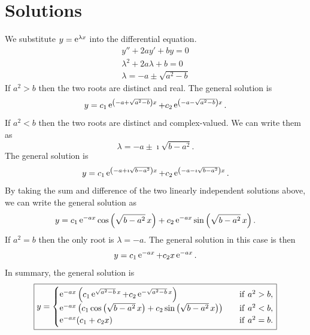 {
}
\raggedbottom
\pagebreak
\flushbottom
\section{Solutions}





\begin{Solution}
  \label{solution y+2ay+by}
  We substitute $y = \mathop{\mathrm{e}}\nolimits^{\lambda x}$ into the differential equation.
  \begin{gather*}
    y'' + 2 a y' + b y = 0 \\
    \lambda^2 + 2 a \lambda + b = 0 \\
    \lambda = -a \pm \sqrt{a^2 - b}
  \end{gather*}
  If $a^2 > b$ then the two roots are distinct and real.  The general solution
  is
  \[
  y = c_1 \mathop{\mathrm{e}}\nolimits^{\left(-a + \sqrt{a^2 - b} \right) x} 
  + c_2 \mathop{\mathrm{e}}\nolimits^{\left(-a - \sqrt{a^2 - b} \right) x}.
  \]
  If $a^2 < b$ then the two roots are distinct and complex-valued.  We 
  can write them as
  \[
  \lambda = -a \pm \imath \sqrt{b - a^2}.
  \]
  The general solution is
  \[
  y = c_1 \mathop{\mathrm{e}}\nolimits^{\left(-a + \imath \sqrt{b - a^2} \right) x} 
  + c_2 \mathop{\mathrm{e}}\nolimits^{\left(-a - \imath \sqrt{b - a^2} \right) x}.
  \]
  By taking the sum and difference of the two linearly independent solutions
  above, we can write the general solution as
  \[
  y = c_1 \mathop{\mathrm{e}}\nolimits^{-a x} \cos\left( \sqrt{b - a^2}\, x \right)
  + c_2 \mathop{\mathrm{e}}\nolimits^{-a x} \sin\left( \sqrt{b - a^2}\, x \right).
  \]
  If $a^2 = b$ then the only root is $\lambda = -a$.  The general solution in
  this case is then
  \[
  y = c_1 \mathop{\mathrm{e}}\nolimits^{-a x} + c_2 x \mathop{\mathrm{e}}\nolimits^{-a x}.
  \]
  In summary, the general solution is
  \[
  \boxed{
    y = 
    \begin{cases}
      \mathop{\mathrm{e}}\nolimits^{-a x} \left( c_1 \mathop{\mathrm{e}}\nolimits^{\sqrt{a^2-b}\,x} 
        + c_2 \mathop{\mathrm{e}}\nolimits^{-\sqrt{a^2-b}\,x} \right)
      \quad &\mathrm{if}\ a^2 > b, \\
      \mathop{\mathrm{e}}\nolimits^{-a x} \left( c_1 \cos \left( \sqrt{b - a^2}\,x \right) 
        + c_2 \sin \left( \sqrt{b-a^2}\,x \right) \right)
      \quad &\mathrm{if}\ a^2 < b, \\
      \mathop{\mathrm{e}}\nolimits^{-a x} ( c_1 + c_2 x ) 
      \quad &\mathrm{if}\ a^2 = b. 
    \end{cases}
    }
  \]
\end{Solution}



